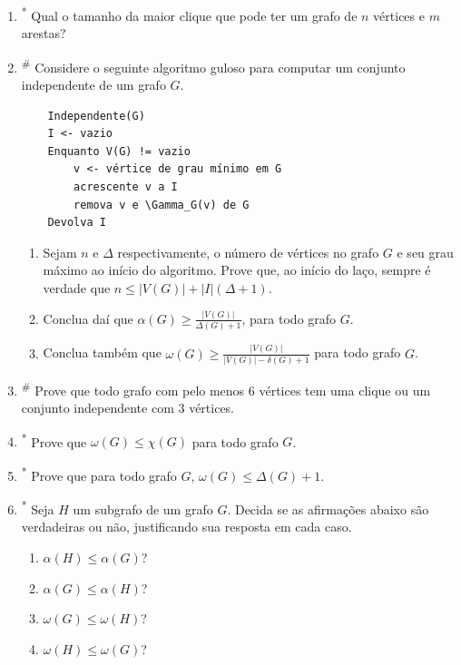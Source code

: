 \begin{enumerate}[label=\textbf{\arabic*.}, ref=\arabic*, resume]
    \begin{enumerate}
        \item Um conjunto $X$ é independente em $G$ se e somente se $X$ é clique em $\overline{G}$
        \item $\alpha(G)=\omega(\overline{G})$ 
    \end{enumerate}
    
    \item\textsuperscript{*} Qual o tamanho da maior clique que pode ter um grafo de $n$ vértices e $m$ arestas? 
    
    \item\textsuperscript{\#} Considere o seguinte algoritmo guloso para computar um conjunto independente de um grafo $G$. 
    \begin{verbatim}
    Independente(G)
    I <- vazio
    Enquanto V(G) != vazio
        v <- vértice de grau mínimo em G
        acrescente v a I
        remova v e \Gamma_G(v) de G
    Devolva I
    \end{verbatim} 
    \begin{enumerate}
        \item Sejam $n$ e $\Delta$ respectivamente, o número de vértices no grafo $G$ e seu grau máximo ao início do algoritmo. Prove que, ao início do laço, sempre é verdade que $n\le|V(G)|+|I|(\Delta+1)$. 
        \item Conclua daí que $\alpha(G)\ge\frac{|V(G)|}{\Delta(G)+1}$, para todo grafo $G$. 
        \item Conclua também que $\omega(G)\ge\frac{|V(G)|}{|V(G)|-\delta(G)+1}$ para todo grafo $G$. 
        
    \end{enumerate}
    
    \item\textsuperscript{\#} Prove que todo grafo com pelo menos 6 vértices tem uma clique ou um conjunto independente com 3 vértices. 
    
    \item\textsuperscript{*} Prove que $\omega(G)\le\chi(G)$ para todo grafo $G$. 
    
    \item\textsuperscript{*} Prove que para todo grafo $G$, $\omega(G)\le\Delta(G)+1$. 
    
    \item\textsuperscript{*} Seja $H$ um subgrafo de um grafo $G$. Decida se as afirmações abaixo são verdadeiras ou não, justificando sua resposta em cada caso. 
    \begin{enumerate}
        \item $\alpha(H)\le\alpha(G)$? 
        \item $\alpha(G)\le\alpha(H)$? 
        \item $\omega(G)\le\omega(H)$? 
        \item $\omega(H)\le\omega(G)$?
    \end{enumerate}
    

\end{enumerate}
